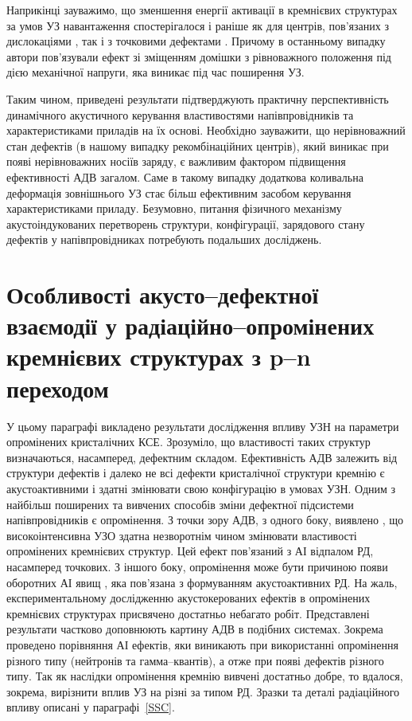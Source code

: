 Наприкінці зауважимо, що зменшення енергії активації в кремнієвих структурах за умов
УЗ навантаження спостерігалося і раніше як для центрів, пов'язаних з дислокаціями \cite{KorotchFTP1996}, так і з точковими дефектами \cite{Korotchenkov1995}.
Причому в останньому випадку автори пов'язували ефект зі зміщенням домішки з рівноважного положення під дією механічної напруги, яка виникає під час поширення УЗ.


Таким чином, приведені результати підтверджують практичну перспективність динамічного акустичного керування властивостями напівпровідників та характеристиками приладів на їх основі.
Необхідно зауважити, що нерівноважний стан дефектів (в нашому випадку рекомбінаційних центрів), який виникає при появі нерівноважних носіїв заряду,
є важливим фактором підвищення ефективності АДВ загалом.
Саме в такому випадку додаткова коливальна деформація зовнішнього УЗ стає більш ефективним засобом керування характеристиками приладу.
Безумовно, питання фізичного механізму акустоіндукованих перетворень структури, конфігурації, зарядового стану дефектів у напівпровідниках потребують подальших досліджень.



\section{Особливості акусто--дефектної взаємодії у радіаційно--опромінених кремнієвих структурах з p--n переходом\label{Rad_SSC}}
У цьому параграфі викладено результати дослідження впливу УЗН на параметри опромінених кристалічних КСЕ.
Зрозуміло, що властивості таких структур визначаються, насамперед, дефектним складом.
Ефективність АДВ залежить від структури дефектів \cite{UST:Medvid} і
далеко не всі дефекти кристалічної структури кремнію є акустоактивними і здатні змінювати свою конфігурацію в умовах УЗН.
Одним з найбільш поширених та вивчених способів зміни дефектної підсистеми напівпровідників є опромінення.
З точки зору АДВ, з одного боку, виявлено \cite{YOlikh2007TPLr,Parchinskii2006r,Gorb2010,Podolian2012r}, що високоінтенсивна УЗО
здатна незворотнім чином змінювати властивості опромінених кремнієвих структур.
Цей ефект пов'язаний з АІ відпалом РД, насамперед точкових.
З іншого боку, опромінення може бути причиною появи оборотних АІ явищ \cite{YOlikh2006TPLr,YOlikhTPL2011r},
яка пов'язана з формуванням акустоактивних РД.
На жаль, експериментальному  дослідженню акустокерованих ефектів в опромінених кремнієвих структурах присвячено достатньо небагато робіт.
Представлені результати частково доповнюють картину АДВ в подібних системах.
Зокрема проведено порівняння АІ ефектів, яки виникають при використанні опромінення різного типу (нейтронів та гамма--квантів),
а отже при появі дефектів різного типу.
Так як наслідки опромінення кремнію вивчені достатньо добре, то вдалося, зокрема, вирізнити
вплив УЗ на різні за типом РД.
Зразки та деталі радіаційного впливу описані у параграфі~\ref{SSC}.

